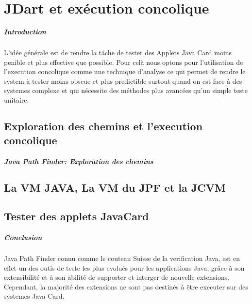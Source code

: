 \chapter{JDart et exécution concolique}
  \paragraph{Introduction}
    L'idée générale est de rendre la tâche de tester des Applets Java Card moins penible et plus effective que possible.
    Pour celà nous optons pour l'utilisation de l'execution concolique comme une technique d'analyse ce qui permet de rendre 
    le system à tester moins obscue et plus predictible surtout quand on est face à des systemes complexe
    et qui nécessite des méthodes plus avancées qu'un simple teste unitaire.
  \section{Exploration des chemins et l'execution concolique}
    \paragraph{Java Path Finder: Exploration des chemins}
  \section{La VM JAVA, La VM du JPF et la JCVM}
  \section{Tester des applets JavaCard}
  \paragraph{Conclusion}
    Java Path Finder connu comme le couteau Suisse de la verification Java,
    est en effet un des outis de teste les plus evolués pour les applications Java,
    grâce à son extensibilité et à son abilité de supporter et interger de nouvelle extensions.
    Cependant, la majorité des extensions ne sont pas destinés à être executer sur des systemes Java Card.